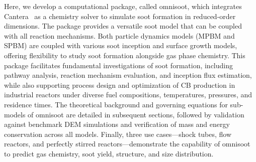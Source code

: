 



Here, we develop a computational package, called omnisoot, which integrates Cantera~\citep{cantera} as a chemistry solver to simulate soot formation in reduced-order dimensions. The package provides a versatile soot model that can be coupled with all reaction mechanisms. Both particle dynamics models (MPBM and SPBM) are coupled with various soot inception and surface growth models,  offering flexibility to study soot formation alongside gas phase chemistry. This package facilitates fundamental investigations of soot formation, including pathway analysis, reaction mechanism evaluation, and inception flux estimation, while also supporting process design and optimization of CB production in industrial reactors under diverse fuel compositions, temperatures, pressures, and residence times. The theoretical background and governing equations for sub-models of omnisoot are detailed in subsequent sections, followed by validation against benchmark DEM simulations and verification of mass and energy conservation across all models. Finally, three use cases—shock tubes, flow reactors, and perfectly stirred reactors—demonstrate the capability of omnisoot to predict gas chemistry, soot yield, structure, and size distribution.





